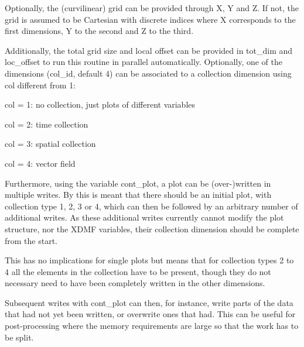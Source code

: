 Optionally, the (curvilinear) grid can be provided through {\ttfamily X}, {\ttfamily Y} and {\ttfamily Z}. If not, the grid is assumed to be Cartesian with discrete indices where {\ttfamily X} corresponds to the first dimensions, {\ttfamily Y} to the second and {\ttfamily Z} to the third.

Additionally, the total grid size and local offset can be provided in {\ttfamily tot\+\_\+dim} and {\ttfamily loc\+\_\+offset} to run this routine in parallel automatically. Optionally, one of the dimensions ({\ttfamily col\+\_\+id}, default 4) can be associated to a collection dimension using {\ttfamily col} different from 1\+:
\begin{DoxyItemize}
\item {\ttfamily col} = 1\+: no collection, just plots of different variables
\item {\ttfamily col} = 2\+: time collection
\item {\ttfamily col} = 3\+: spatial collection
\item {\ttfamily col} = 4\+: vector field
\end{DoxyItemize}

Furthermore, using the variable {\ttfamily cont\+\_\+plot}, a plot can be (over-\/)written in multiple writes. By this is meant that there should be an initial plot, with collection type 1, 2, 3 or 4, which can then be followed by an arbitrary number of additional writes. As these additional writes currently cannot modify the plot structure, nor the X\+D\+MF variables, their collection dimension should be complete from the start.

This has no implications for single plots but means that for collection types 2 to 4 all the elements in the collection have to be present, though they do not necessary need to have been completely written in the other dimensions.

Subsequent writes with {\ttfamily cont\+\_\+plot} can then, for instance, write parts of the data that had not yet been written, or overwrite ones that had. This can be useful for post-\/processing where the memory requirements are large so that the work has to be split.

